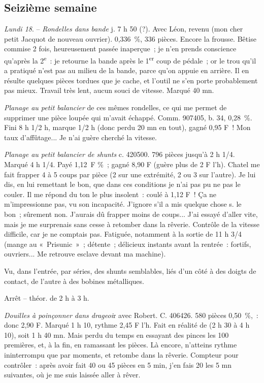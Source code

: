 \documentclass[french,twoside]{book} %
\begin{document}
\subsection[Seizième semaine]{Seizième semaine}
\noindent \par
{\itshape Lundi 18}. – {\itshape Rondelles dans bande} j. 7 h 50 (?). Avec Léon, revenu (mon cher petit Jacquot de nouveau ouvrier). 0,336 \%, 336 pièces. Encore la frousse. Bêtise commise 2 fois, heureusement passée inaperçue ; je n'en prends conscience qu'après la 2\textsuperscript{e} : je retourne la bande après le 1\textsuperscript{er} coup de pédale ; or le trou qu'il a pratiqué n'est pas au milieu de la bande, parce qu'on appuie en arrière. Il en résulte quelques pièces tordues que je cache, et l'outil ne s'en porte probablement pas mieux. Travail très lent, aucun souci de vitesse. Marqué 40 mn.\par
{\itshape Planage au petit balancier} de ces mêmes rondelles, ce qui me permet de supprimer une pièce loupée qui m'avait échappé. Comm. 907405, b. 34, 0,28 \%. Fini 8 h 1/2 h, marque 1/2 h (donc perdu 20 mn en tout), gagné 0,95 F ! Mon taux d'affûtage... Je n'ai guère cherché la vitesse.\par
{\itshape Planage au petit balancier de shunts} c. 420500. 796 pièces jusqu'à 2 h 1/4. Marqué 4 h 1/4. Payé 1,12 F \% ; gagné 8,90 F (guère plus de 2 F l'h). Chatel me fait frapper 4 à 5 coups par pièce (2 sur une extrémité, 2 ou 3 sur l'autre). Je lui dis, en lui remettant le bon, que dans ces conditions je n'ai pas pu ne pas le couler. Il me répond du ton le plus insolent : coulé à 1,12 F ! Ça ne m'impressionne pas, vu son incapacité. J'ignore s'il a mis quelque chose s. le bon ; sûrement non. J'aurais dû frapper moins de coups... J'ai essayé d'aller vite, mais je me surprenais sans cesse à retomber dans la rêverie. Contrôle de la vitesse difficile, car je ne comptais pas. Fatiguée, notamment à la sortie de 11 h 3/4 (mange au « Prisunic » ; détente ; délicieux instants avant la rentrée : fortifs, ouvriers... Me retrouve esclave devant ma machine).\par
Vu, dans l'entrée, par séries, des shunts semblables, liés d'un côté à des doigts de contact, de l'autre à des bobines métalliques.\par
Arrêt – théor. de 2 h à 3 h.\par
{\itshape Douilles à poinçonner dans drageoi}r avec Robert. C. 406426. 580 pièces 0,50 \%, : donc 2,90 F. Marqué 1 h 10, rythme 2,45 F l'h. Fait en réalité de (2 h 30 à 4 h 10), soit 1 h 40 mn. Mais perdu du temps en essayant des pinces les 100 premières, et, à la fin, en ramassant les pièces. Là encore, n'atteins rythme ininterrompu que par moments, et retombe dans la rêverie. Compteur pour contrôler : après avoir fait 40 ou 45 pièces en 5 min, j'en fais 20 les 5 mn suivantes, où je me suis laissée aller à rêver.\par
\end{document}
